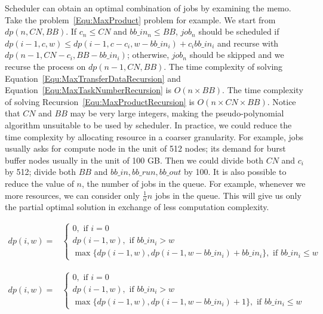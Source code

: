 Scheduler can obtain an optimal combination of jobs by examining the memo.
Take the problem~\ref{Equ:MaxProduct} problem for example.
We start from $dp(n, CN, BB)$.
If $c_n \leq CN$ and $bb\_in_n \leq BB$, $job_n$ should be scheduled if
$dp(i-1, c, w) \leq dp(i-1, c - c_i, w - bb\_in_i) + c_i bb\_in_i$ and
recurse with $dp(n - 1, CN - c_i, BB - bb\_in_i)$;
otherwise, $job_n$ should be skipped and we recurse the process on $dp(n-1, CN, BB)$.
The time complexity of solving Equation~\ref{Equ:MaxTransferDataRecursion} and
Equation~\ref{Equ:MaxTaskNumberRecursion} is $O(n\times BB)$.
The time complexity of solving Recursion~\ref{Equ:MaxProductRecursion}
is $O(n\times CN\times BB)$.
Notice that $CN$ and $BB$ may be very large integers,
making the pseudo-polynomial algorithm unsuitable
to be used by scheduler.
In practice, we could reduce the time complexity by allocating resource
in a coarser granularity.
For example, jobs usually asks for compute node in the unit of 512 nodes;
its demand for burst buffer nodes usually in the unit of 100 GB.
Then we could divide both $CN$ and $c_i$ by 512;
divide both $BB$ and $bb\_in, bb\_run, bb\_out$ by 100.
It is also possible to reduce the value of $n$, the number of jobs in the queue.
For example, whenever we more resources,
we can consider only $\frac{1}{\alpha}n$ jobs in the queue.
This will give us only the partial optimal solution in exchange of less computation complexity.



\begin{strip}
        \begin{align}
                dp(i, w) = & 
                \left\{
                        \begin{array}{l}
                                0, \text{ if $i=0$ } \\ [1em]
                                dp(i-1, w), \text{ if $bb\_in_i > w$} \\ [1em]
                                \max \{ dp(i-1, w), dp(i-1, w-bb\_in_i) + bb\_in_i \}, \text{ if $bb\_in_i \leq w$}
                        \end{array} 
                \right.
                \label{Equ:MaxTransferDataRecursion} 
        \end{align}
\end{strip}

\begin{strip}
        \begin{align}
                dp(i, w) = &
                \left\{
                        \begin{array}{l}
                                0, \text{ if $i=0$ } \\ [1em]
                                dp(i-1, w), \text{ if $bb\_in_i > w$} \\ [1em]
                                \max \{ dp(i-1, w), dp(i-1, w-bb\_in_i) + 1 \}, \text{ if $bb\_in_i \leq w$}
                        \end{array} 
                \right.
                \label{Equ:MaxTaskNumberRecursion}
        \end{align}
\end{strip}


